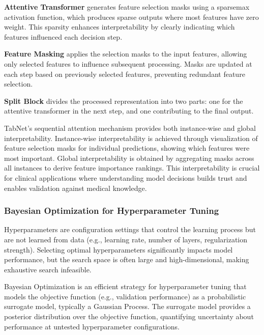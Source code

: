 \textbf{Attentive Transformer} generates feature selection masks using a sparsemax activation function, which produces sparse outputs where most features have zero weight. This sparsity enhances interpretability by clearly indicating which features influenced each decision step.

\textbf{Feature Masking} applies the selection masks to the input features, allowing only selected features to influence subsequent processing. Masks are updated at each step based on previously selected features, preventing redundant feature selection.

\textbf{Split Block} divides the processed representation into two parts: one for the attentive transformer in the next step, and one contributing to the final output.

TabNet's sequential attention mechanism provides both instance-wise and global interpretability. Instance-wise interpretability is achieved through visualization of feature selection masks for individual predictions, showing which features were most important. Global interpretability is obtained by aggregating masks across all instances to derive feature importance rankings. This interpretability is crucial for clinical applications where understanding model decisions builds trust and enables validation against medical knowledge.


\subsubsection{Bayesian Optimization for Hyperparameter Tuning}

Hyperparameters are configuration settings that control the learning process but are not learned from data (e.g., learning rate, number of layers, regularization strength). Selecting optimal hyperparameters significantly impacts model performance, but the search space is often large and high-dimensional, making exhaustive search infeasible.

Bayesian Optimization is an efficient strategy for hyperparameter tuning that models the objective function (e.g., validation performance) as a probabilistic surrogate model, typically a Gaussian Process. The surrogate model provides a posterior distribution over the objective function, quantifying uncertainty about performance at untested hyperparameter configurations.

